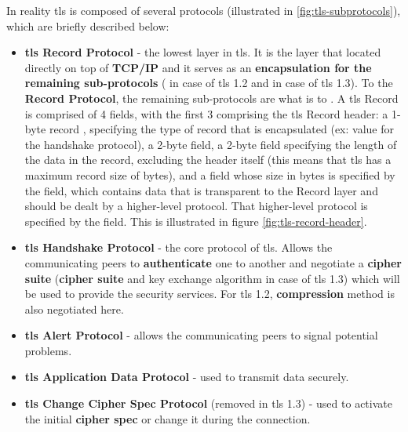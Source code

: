 \documentclass{llncs}
\begin{document}
In reality \gls{tls} is composed of several protocols (illustrated in \ref{fig:tls-subprotocols}), which are briefly described below:
\begin{itemize}
  \item \textbf{\gls{tls} Record Protocol} - the lowest layer in \gls{tls}. It is
  the layer that located directly on top of \textbf{TCP/IP} and it serves as an
   \textbf{encapsulation for the remaining sub-protocols} ( in case of \gls{tls} 1.2
   and  in case of \gls{tls} 1.3). To the  \textbf{Record Protocol},
   the remaining sub-protocols are what  is to .
   A \gls{tls} Record is comprised of 4 fields, with the first 3 comprising the
   \gls{tls} Record header: a 1-byte record ,
   specifying the type of record that is encapsulated (ex: value 
   for the handshake protocol), a 2-byte  field, a
   2-byte  field specifying the length of the data in the record, excluding
   the header itself (this means that \gls{tls} has a maximum record size
   of  bytes), and a  field whose size in bytes is specified
   by the  field, which contains data that is
   transparent to the Record layer and should be dealt by a higher-level protocol. That higher-level protocol is specified by the  field. This is illustrated in figure \ref{fig:tls-record-header}.
  \item \textbf{\gls{tls} Handshake Protocol} - the core protocol of \gls{tls}.
  Allows the communicating peers to \textbf{authenticate} one to another and negotiate
  a \textbf{cipher suite} (\textbf{cipher suite} and key exchange algorithm in case of \gls{tls} 1.3) which will be used to provide the security services. For \gls{tls} 1.2,
  \textbf{compression} method is also negotiated here.
  \item \textbf{\gls{tls} Alert Protocol} - allows the communicating peers to
  signal potential problems.
  \item \textbf{\gls{tls} Application Data Protocol} - used to transmit data securely.
  \item \textbf{\gls{tls} Change Cipher Spec Protocol} (removed in \gls{tls} 1.3) -
  used to activate the initial \textbf{cipher spec} or change it during the connection.
\end{itemize}
\end{document}
